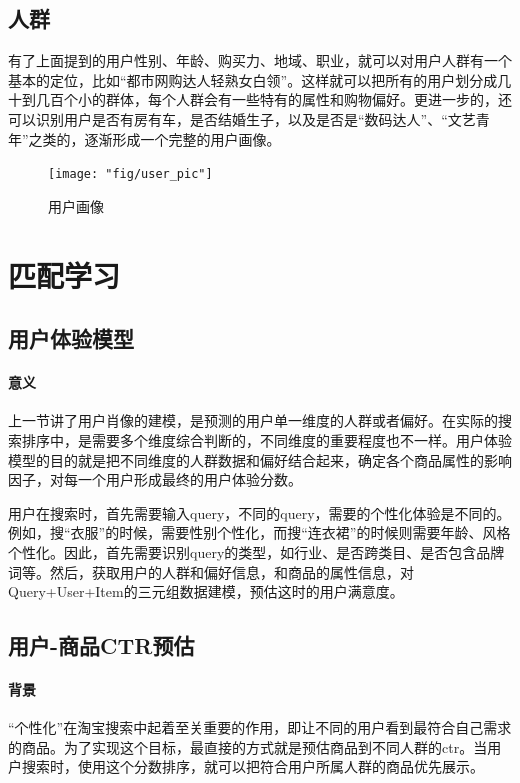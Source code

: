 	\subsection{人群}
	
	有了上面提到的用户性别、年龄、购买力、地域、职业，就可以对用户人群有一个基本的定位，比如“都市网购达人轻熟女白领”。这样就可以把所有的用户划分成几十到几百个小的群体，每个人群会有一些特有的属性和购物偏好。更进一步的，还可以识别用户是否有房有车，是否结婚生子，以及是否是“数码达人”、“文艺青年”之类的，逐渐形成一个完整的用户画像。
	
	\begin{figure}[h]
		\centering
		\texttt{[image: "fig/user\_pic"]}
		\caption{用户画像}
		\label{fig:user_pic}
	\end{figure}
	

\section{匹配学习}
	\subsection{用户体验模型}
	\paragraph{意义}
	
	上一节讲了用户肖像的建模，是预测的用户单一维度的人群或者偏好。在实际的搜索排序中，是需要多个维度综合判断的，不同维度的重要程度也不一样。用户体验模型的目的就是把不同维度的人群数据和偏好结合起来，确定各个商品属性的影响因子，对每一个用户形成最终的用户体验分数。
	
	用户在搜索时，首先需要输入query，不同的query，需要的个性化体验是不同的。例如，搜“衣服”的时候，需要性别个性化，而搜“连衣裙”的时候则需要年龄、风格个性化。因此，首先需要识别query的类型，如行业、是否跨类目、是否包含品牌词等。然后，获取用户的人群和偏好信息，和商品的属性信息，对Query+User+Item的三元组数据建模，预估这时的用户满意度。
	
	\subsection{用户-商品CTR预估}
	\paragraph{背景}
	“个性化”在淘宝搜索中起着至关重要的作用，即让不同的用户看到最符合自己需求的商品。为了实现这个目标，最直接的方式就是预估商品到不同人群的ctr。当用户搜索时，使用这个分数排序，就可以把符合用户所属人群的商品优先展示。
